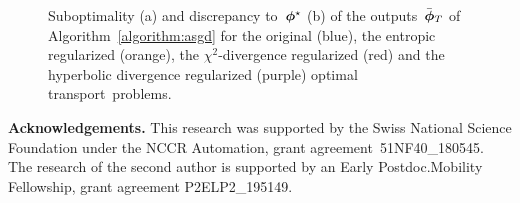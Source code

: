 \documentclass[11pt, a4paper, oneside, reqno]{article}
\begin{document}
\begin{figure}[t]
\begin{subfigure}[h]{0.43\columnwidth}
         \caption{}
         \label{fig:dualvars}
     \end{subfigure}
        \caption{Suboptimality (a) and discrepancy to~$\boldsymbol\phi^\star$ (b) of the outputs~$\bar{\boldsymbol \phi}_T$ of Algorithm~\ref{algorithm:asgd} for the original (blue), the entropic regularized (orange), the $\chi^2$-divergence regularized (red) {\color{black} and the hyperbolic divergence regularized (purple)} optimal transport~problems.}  \label{fig:num_results}
    \end{figure}
    
    \textbf{Acknowledgements.} This research was supported by the Swiss National Science Foundation under the NCCR Automation, grant agreement~51NF40\_180545. The research of the second author is supported by an Early Postdoc.Mobility Fellowship, grant agreement P2ELP2\_195149.
    
\end{document}
